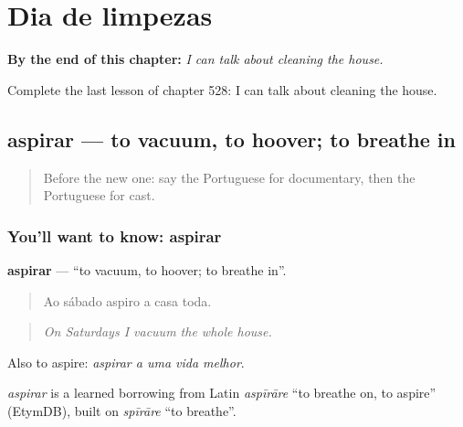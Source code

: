 
\chapter{Dia de limpezas}
\label{ch:pt-dia-de-limpezas}

\begin{chapteropening}
\textbf{By the end of this chapter:} \emph{I can talk about cleaning the house.}

Complete the last lesson of chapter 528: I can talk about cleaning the house.
\end{chapteropening}

\section[aspirar]{aspirar — to vacuum, to hoover; to breathe in}

\label{lesson:PT-C528-aspirar}



\begin{quote}
Before the new one: say the Portuguese for documentary, then the Portuguese for cast.
\end{quote}

\subsection*{You'll want to know: aspirar}
\textbf{aspirar} — \textquotedblleft{}to vacuum, to hoover; to breathe in\textquotedblright{}.

\begin{quote}
Ao sábado aspiro a casa toda.
\end{quote}

\begin{quote}
\emph{On Saturdays I vacuum the whole house.}
\end{quote}

Also to aspire: \emph{aspirar a uma vida melhor}.

\begin{cousinweb}
\emph{aspirar} is a learned borrowing from Latin \emph{aspīrāre} \textquotedblleft{}to breathe on, to aspire\textquotedblright{} (EtymDB), built on \emph{spīrāre} \textquotedblleft{}to breathe\textquotedblright{}.
\end{cousinweb}

